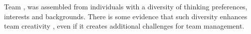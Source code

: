 Team \pmt, was assembled from individuals with a diversity of thinking preferences, interests and backgrounds. There is some evidence that such diversity enhances team creativity \cite{Wilde97} \cite{Wilde07}, even if it creates additional challenges for team management.

%
%


